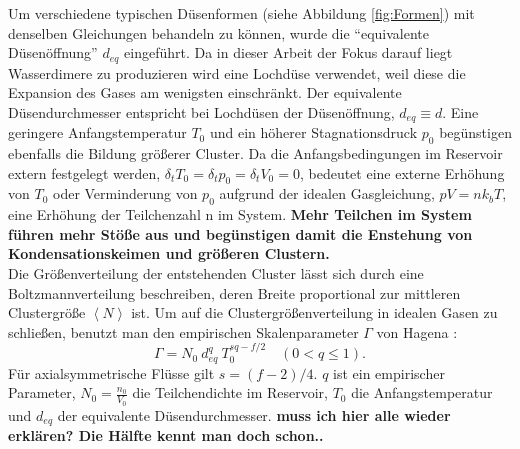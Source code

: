 Um verschiedene typischen Düsenformen (siehe Abbildung \ref{fig:Formen}) mit denselben Gleichungen behandeln zu können, wurde die \enquote{equivalente Düsenöffnung} $d_{eq}$ eingeführt. Da in dieser Arbeit der Fokus darauf liegt Wasserdimere zu produzieren wird eine Lochdüse verwendet, weil diese die Expansion des Gases am wenigsten einschränkt. Der equivalente Düsendurchmesser entspricht bei Lochdüsen der Düsenöffnung, $d_{eq} \equiv d$.
%
Eine geringere Anfangstemperatur $T_0$ und ein höherer Stagnationsdruck $p_0$ begünstigen ebenfalls die Bildung größerer Cluster. Da die Anfangsbedingungen im Reservoir extern festgelegt werden, $\delta_t T_0 = \delta_t p_0 = \delta_t V_0 = 0$, bedeutet eine externe Erhöhung von $T_0$ oder Verminderung von $p_0$ aufgrund der idealen Gasgleichung, $pV = nk_bT$, eine Erhöhung der Teilchenzahl n im System. \textbf{Mehr Teilchen im System führen mehr Stöße aus und begünstigen damit die Enstehung von Kondensationskeimen und größeren Clustern.} \\
%
Die Größenverteilung der entstehenden Cluster lässt sich durch eine Boltzmannverteilung beschreiben, deren Breite proportional zur mittleren Clustergröße $\left\langle N \right\rangle$ ist. Um auf die Clustergrößenverteilung in idealen Gasen zu schließen, benutzt man den empirischen Skalenparameter $\Gamma$ von Hagena \cite{hagena1987}:
%
\begin{equation} \label{eq:Skalenparameter}
\Gamma = N_0\ d_{eq}^q\ T_0^{sq - f/2} \quad (0 < q \leq 1).
\end{equation}
%
Für axialsymmetrische Flüsse gilt $s = (f-2)/4$. $q$ ist ein empirischer Parameter, $N_0 = \frac{n_0}{V_0}$ die Teilchendichte im Reservoir, $T_0$ die Anfangstemperatur und $d_{eq}$ der equivalente Düsendurchmesser. \textbf{muss ich hier alle wieder erklären? Die Hälfte kennt man doch schon..}

